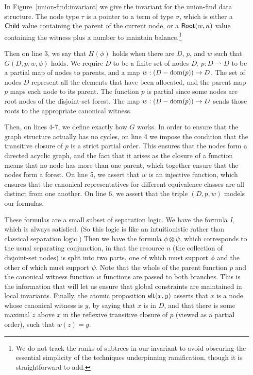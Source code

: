In Figure~\ref{union-find:invariant} we give the invariant for the
union-find data structure. The node type $\tau$ is a pointer to a 
term of type $\sigma$, which is either a $\mathsf{Child}$ value containing
the parent of the current node, or a $\mathsf{Root}(w, n)$ value containing
the witness plus a number to maintain balance.\footnote{We do not track the
ranks of subtrees in our invariant to avoid obscuring the essential
simplicity of the techniques underpinning ramification, though it is
straightforward to add.}

Then on line 3, we say that $H(\phi)$ holds when there are $D$, $p$, and
$w$ such that $G(D, p, w, \phi)$ holds. We require $D$ to be a finite set of
nodes $D$, $p : D \rightharpoonup D$ to be a partial map of nodes to parents, and a 
map $w : (D - \mbox{dom}({p})) \to D$. The set of nodes $D$ represent all the elements that have
been allocated, and the parent map $p$ maps each node to its
parent. The function $p$ is partial since some nodes are root nodes of
the disjoint-set forest. The map $w : (D - \mbox{dom}({p})) \to D$ sends
those roots to the appropriate canonical witness.

Then, on lines 4-7, we define exactly how $G$ works. In order to
ensure that the graph structure actually has no cycles, on line 4 we
impose the condition that the transitive closure of $p$ is a strict
partial order. This ensures that the nodes form a directed acyclic
graph, and the fact that it arises as the closure of a function means
that no node has more than one parent, which together ensure that the
nodes form a forest. On line 5, we assert that $w$ is an injective
function, which ensures that the canonical representatives for different
equivalence classes are all distinct from one another. On line 6, we
assert that the triple $(D, p, w)$ models our formulas.

These formulas are a small subset of separation logic. We have the
formula $I$, which is always satisfied. (So this logic is like an
intuitionistic rather than classical separation logic.) Then we have
the formula $\phi \otimes \psi$, which corresponds to the usual
separating conjunction, in that the resource $n$ (the collection of
disjoint-set nodes) is split into two parts, one of which must support
$\phi$ and the other of which must support $\psi$. Note that the whole
of the parent function $p$ and the canonical witness function $w$
functions are passed to both branches. This is the information that
will let us ensure that global constraints are maintained in local
invariants. Finally, the atomic proposition $\mathsf{elt}({x}, {y})$ asserts that
$x$ is a node whose canonical witness is $y$, by saying that $x$ is in
$D$, and that there is some maximal $z$ above $x$ in the reflexive
transitive closure of $p$ (viewed as a partial order), such that $w(z)
= y$.

